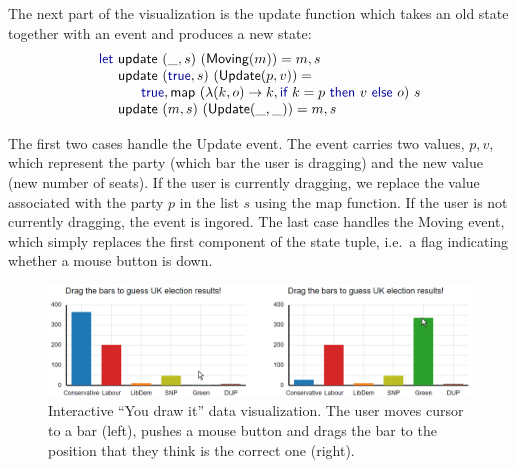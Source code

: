 \documentclass{jfp}
\newcommand{\ident}[1]{\textnormal{\textcolor{idclr}{\sffamily #1}}}
\newcommand{\fkvd}[1]{\textnormal{\textcolor{fkvdclr}{\sffamily #1}}}
\begin{document}
The next part of the visualization is the \ident{update} function which takes an old state together
with an event and produces a new state:
%
\begin{equation*}
\begin{array}{l}
\fkvd{let}~\ident{update}~(\_,s)~(\ident{Moving}(m)) = m,s\\
\hspace{1.05em}~\ident{update}~(\fkvd{true},s)~(\ident{Update}(p, v)) =\\
\hspace{1.05em}\qquad  \fkvd{true}, \ident{map}~(\lambda(k, o) \rightarrow k, \fkvd{if}~k = p~\fkvd{then}~v~\fkvd{else}~o)~s\\
\hspace{1.05em}~\ident{update}~(m,s)~(\ident{Update}(\_, \_)) = m,s\\
\end{array}
\end{equation*}

\vspace{-0.5em}
\noindent
The first two cases handle the \ident{Update} event. The event carries two values, $p, v$, which
represent the party (which bar the user is dragging) and the new value (new number of seats).
If the user is currently dragging, we replace the value associated with the party $p$ in \newpage \noindent the
list $s$ using the \ident{map} function. If the user is not currently dragging, the event is ingored.
The last case handles the \ident{Moving} event, which simply replaces the first component of the
state tuple, i.e.~a flag indicating whether a mouse button is down.


\begin{figure}[t]
  \vspace{0.5em}
  \includegraphics[scale=0.57]{figures/youdraw}
  \vspace{1em}
  \caption{Interactive ``You draw it'' data visualization. The user moves cursor to a bar (left),
    pushes a mouse button and drags the bar to the position that they think is the correct one (right).}
  \label{fig:youdraw}
\end{figure}
\end{document}
